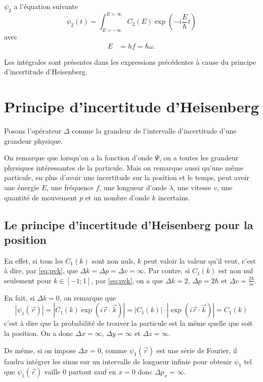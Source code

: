 $\psi_2$ a l'équation suivante
\[ \psi_2(t) = \int_{E=-\infty}^{E=\infty}
C_2(E) \exp\left(-i \frac{E}{\hbar} t\right) \]
avec
\begin{align}
  \label{eq:Ef}
  E & = hf = \hbar\omega.
\end{align}

Les intégrales sont présentes dans les expressions précédentes
à cause du principe d'incertitude d'Heisenberg.

\section{Principe d'incertitude d'Heisenberg}
\begin{mynota}
  Posons l'opérateur $\Delta$ comme
  la grandeur de l’intervalle d'incertitude
  d'une grandeur physique.
\end{mynota}

On remarque que lorsqu'on a la fonction d'onde $\Psi$,
on a toutes les grandeur physiques intéressantes de la particule.
Mais on remarque aussi qu'une même particule,
en plus d'avoir une incertitude sur la position et le temps,
peut avoir une énergie $E$, une fréquence $f$,
une longueur d'onde $\lambda$, une vitesse $v$,
une quantité de mouvement $p$ et un nombre d'onde $k$ incertains.

\subsection{Le principe d'incertitude d'Heisenberg pour la position}
En effet, si tous les $C_1(k)$ sont non nuls,
$k$ peut valoir la valeur qu'il veut,
c'est à dire, par \eqref{eq:pvk}, que
$\Delta k = \Delta p = \Delta v = \infty$.
Par contre, si $C_1(k)$ est non nul seulement
pour $k \in [-1;1]$, par \eqref{eq:pvk}, on a que
$\Delta k = 2$, $\Delta p = 2\hbar$ et $\Delta v = \frac{2\hbar}{m}$.

En fait, si $\Delta k = 0$, on remarque que
\[ |\psi_1(\vec{r})|
= \left|C_1(k) \exp\left(i\vec{r} \cdot \vec{k}\right)\right|
= \left|C_1(k)\right|\cdot\left|\exp\left(i\vec{r} \cdot \vec{k}\right)\right|
= C_1(k) \]
c'est à dire que la probabilité de trouver la particule est la même
quelle que soit la position.
On a donc $\Delta x = \infty$, $\Delta y = \infty$ et $\Delta z = \infty$.

De même, si on impose $\Delta x = 0$, comme $\psi_1(\vec{r})$ est une
série de Fourier, il faudra intégrer les sinus
sur un intervalle de longueur infinie pour obtenir
$\psi_1$ tel que $\psi_1(\vec{r})$ vaille 0 partout sauf en $x = 0$ donc
$\Delta p_x = \infty$.

